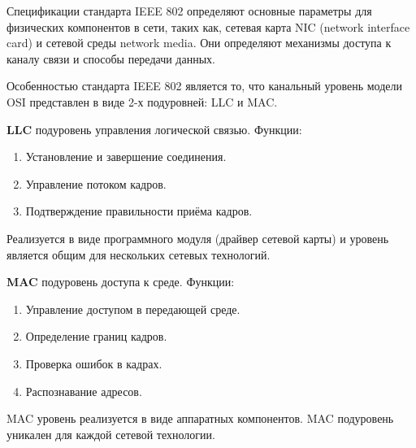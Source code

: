 \documentclass[12pt, russian, oneside, article]{ncc}
\begin{document}
Спецификации стандарта IEEE 802 определяют основные параметры для физических компонентов в сети, таких как, сетевая карта NIC (network interface card) и сетевой среды network media. Они определяют механизмы доступа к каналу связи и способы передачи данных.

Особенностью стандарта IEEE 802 является то, что канальный уровень модели OSI представлен в виде 2-х подуровней: LLC и MAC.

\textbf{LLC} подуровень управления логической связью. Функции:
\begin{enumerate}
\item Установление и завершение соединения.
\item Управление потоком кадров.
\item Подтверждение правильности приёма кадров.
\end{enumerate}

Реализуется в виде программного модуля (драйвер сетевой карты) и уровень является общим для нескольких сетевых технологий.

\textbf{MAC} подуровень доступа к среде. Функции:
\begin{enumerate}
\item Управление доступом в передающей среде.
\item Определение границ кадров.
\item Проверка ошибок в кадрах.
\item Распознавание адресов.
\end{enumerate}

MAC уровень реализуется в виде аппаратных компонентов. MAC подуровень уникален для каждой сетевой технологии.
\end{document}
